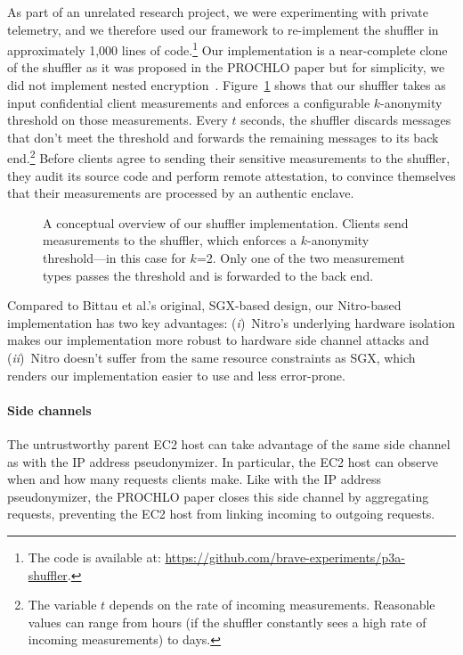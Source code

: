 As part of an unrelated research project, we were experimenting with private
telemetry, and we therefore used our framework to re-implement the shuffler in
approximately 1,000 lines of code.\footnote{The code is available at:
\url{https://github.com/brave-experiments/p3a-shuffler}.} Our implementation is
a near-complete clone of the shuffler as it was proposed in the PROCHLO paper
but for simplicity, we did not implement nested
encryption~\cite[\S~3]{Bittau2017a}.  Figure~\ref{fig:shuffler} shows that our
shuffler takes as input confidential client measurements and enforces a
configurable $k$-anonymity threshold on those measurements.  Every $t$ seconds,
the shuffler discards messages that don't meet the threshold and forwards the
remaining messages to its back end.\footnote{The variable $t$ depends on the
rate of incoming measurements.  Reasonable values can range from hours (if the
shuffler constantly sees a high rate of incoming measurements) to days.} Before
clients agree to sending their sensitive measurements to the shuffler, they
audit its source code and perform remote attestation, to convince themselves
that their measurements are processed by an authentic enclave.

\begin{figure}[t]
\centering

\caption{A conceptual overview of our shuffler implementation.  Clients send
  measurements to the shuffler, which enforces a $k$-anonymity threshold---in
  this case for $k$=2. Only one of the two measurement types passes the
  threshold and is forwarded to the back end.}
\label{fig:shuffler}
\end{figure}

Compared to Bittau et al.'s original, SGX-based design, our Nitro-based
implementation has two key advantages: (\emph{i})~Nitro's underlying hardware
isolation makes our implementation more robust to hardware side channel attacks
and (\emph{ii})~Nitro doesn't suffer from the same resource constraints as SGX,
which renders our implementation easier to use and less error-prone.

\paragraph{Side channels}
The untrustworthy parent EC2 host can take advantage of the same side
channel as with the IP address pseudonymizer.  In particular, the EC2 host
can observe when and how many requests clients make.  Like with the IP address
pseudonymizer, the PROCHLO paper closes this side channel by aggregating
requests, preventing the EC2 host from linking incoming to outgoing
requests.
